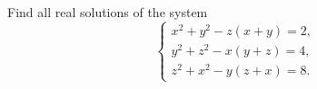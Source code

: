 Find all real solutions of the system \[\begin{cases}x^2 + y^2 - z(x + y) = 2, \\ y^2 + z^2 - x(y + z) = 4, \\ z^2 + x^2 - y(z + x) = 8.\end{cases}\]
